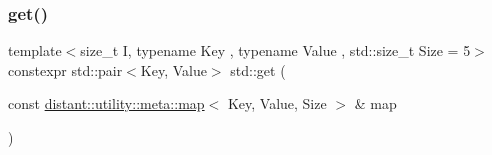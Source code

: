 \subsubsection{\texorpdfstring{get()}{get()}}
{\footnotesize\ttfamily template$<$size\+\_\+t I, typename Key , typename Value , std\+::size\+\_\+t Size = 5$>$ \\
constexpr std\+::pair$<$Key, Value$>$ std\+::get (\begin{DoxyParamCaption}\item[{const \mbox{\hyperlink{classdistant_1_1utility_1_1meta_1_1map}{distant\+::utility\+::meta\+::map}}$<$ Key, Value, Size $>$ \&}]{map }\end{DoxyParamCaption})\hspace{0.3cm}{\ttfamily [noexcept]}}

